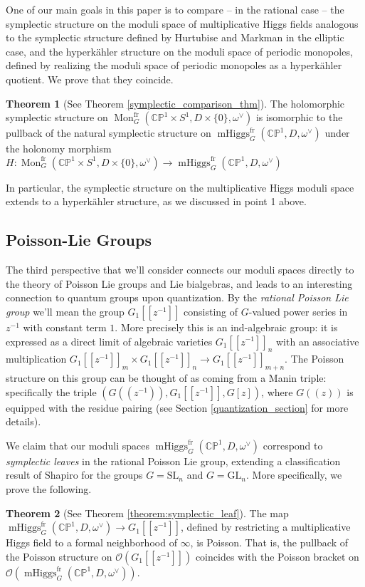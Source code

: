 \documentclass[11pt, oneside, reqno]{amsart}
\theoremstyle{definition} \newtheorem{definition}{Definition}[section]
\newtheorem{theorem}[definition]{Theorem}
\theoremstyle{definition} \newtheorem{remark}[definition]{Remark}
\theoremstyle{definition} \newtheorem{remarks}[definition]{Remarks}
\theoremstyle{definition} \newtheorem{question}[definition]{Question}
\theoremstyle{definition} \newtheorem*{note}{Note}
\theoremstyle{definition} \newtheorem{example}[definition]{Example}
\theoremstyle{definition} \newtheorem{examples}[definition]{Examples}
\newcommand{\bb}[1]{\mathbb{#1}}
\newcommand{\OO}{\mathcal{O}}
\newcommand{\SL}{\mathrm{SL}}
\newcommand{\GL}{\mathrm{GL}}
\DeclareMathOperator{\mhiggs}{mHiggs}
\DeclareMathOperator{\mon}{Mon}
\newcommand{\fr}{\mathrm{fr}}
\begin{document}
One of our main goals in this paper is to compare -- in the rational case -- the symplectic structure on the moduli space of multiplicative Higgs fields analogous to the symplectic structure defined by Hurtubise and Markman in the elliptic case, and the hyperk\"ahler structure on the moduli space of periodic monopoles, defined by realizing the moduli space of periodic monopoles as a hyperk\"ahler quotient.  We prove that they coincide.

\begin{theorem}[See Theorem \ref{symplectic_comparison_thm}]
  The holomorphic symplectic structure on
  $\mon_G^\fr(\bb{CP}^1 \times S^1,D \times\{0\},\omega^\vee)$ is isomorphic to the pullback of the natural symplectic structure on
  $\mhiggs_G^{\text{fr}}(\bb{CP}^1,D,\omega^\vee)$ under the holonomy morphism $H \colon \mon_G^\fr(\bb{CP}^1 \times S^1,D \times\{0\},\omega^\vee) \to \mhiggs_G^{\text{fr}}(\bb{CP}^1,D,\omega^\vee)$  
\end{theorem}

In particular, the symplectic structure on the multiplicative Higgs moduli space extends to a hyperk\"ahler structure, as we discussed in point 1 above.

\subsection{Poisson-Lie Groups}
The third perspective that we'll consider connects our moduli spaces directly to the theory of Poisson Lie groups and Lie bialgebras, and leads to an interesting connection to quantum groups upon quantization.  By the \emph{rational Poisson Lie group} we'll mean the group $G_1[[z^{-1}]]$ consisting of $G$-valued power series in $z^{-1}$ with constant term $1$.  More precisely this is an ind-algebraic group: it is expressed as a direct limit of algebraic varieties $G_1[[z^{-1}]]_n$ with an associative multiplication $G_1[[z^{-1}]]_m \times G_1[[z^{-1}]]_n \to G_1[[z^{-1}]]_{m+n}$.  The Poisson structure on this group can be thought of as coming from a Manin triple: specifically the triple $(G(\!(z^{-1})\!), G_1[[z^{-1}]], G[z])$, where $G(\!(z)\!)$ is equipped with the residue pairing (see Section \ref{quantization_section} for more details).  

We claim that our moduli spaces $\mhiggs_G^{\text{fr}}(\bb{CP}^1,D,\omega^\vee)$ correspond to \emph{symplectic leaves} in the rational Poisson Lie group, extending a classification result of Shapiro \cite{Shapiro} for the groups $G = \SL_n$ and $G = \GL_n$.  More specifically, we prove the following.
\begin{theorem}[See Theorem \ref{theorem:symplectic_leaf}]
The map $\mhiggs^\fr_G(\bb{CP}^1,D,\omega^\vee) \to G_1[[z^{-1}]]$, defined by restricting a multiplicative Higgs field to a formal neighborhood of $\infty$, is Poisson.  That is, the pullback of the Poisson structure on $\OO(G_1[[z^{-1}]])$ coincides with the Poisson bracket on $\OO(\mhiggs^\fr_G(\bb{CP}^1,D,\omega^\vee))$. 
\end{theorem}
\end{document}
